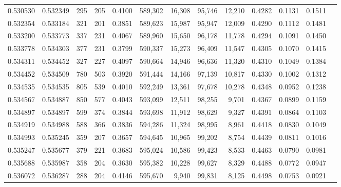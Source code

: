 \begin{tabular}{rrrrrrrrrrrrr}
0.530530 & 0.532349 &   295 &   205 &                                     0.4100 & 589,302 &  16,308 &  95,746 &  12,210 & 0.4282 & 0.1131 & 0.1511 \\
0.532354 & 0.533184 &   321 &   201 &                                     0.3851 & 589,623 &  15,987 &  95,947 &  12,009 & 0.4290 & 0.1112 & 0.1481 \\
0.533200 & 0.533773 &   337 &   231 &                                     0.4067 & 589,960 &  15,650 &  96,178 &  11,778 & 0.4294 & 0.1091 & 0.1450 \\
0.533778 & 0.534303 &   377 &   231 &                                     0.3799 & 590,337 &  15,273 &  96,409 &  11,547 & 0.4305 & 0.1070 & 0.1415 \\
0.534311 & 0.534452 &   327 &   227 &                                     0.4097 & 590,664 &  14,946 &  96,636 &  11,320 & 0.4310 & 0.1049 & 0.1384 \\
0.534452 & 0.534509 &   780 &   503 &                                     0.3920 & 591,444 &  14,166 &  97,139 &  10,817 & 0.4330 & 0.1002 & 0.1312 \\
0.534535 & 0.534535 &   805 &   539 &                                     0.4010 & 592,249 &  13,361 &  97,678 &  10,278 & 0.4348 & 0.0952 & 0.1238 \\
0.534567 & 0.534887 &   850 &   577 &                                     0.4043 & 593,099 &  12,511 &  98,255 &   9,701 & 0.4367 & 0.0899 & 0.1159 \\
0.534897 & 0.534897 &   599 &   374 &                                     0.3844 & 593,698 &  11,912 &  98,629 &   9,327 & 0.4391 & 0.0864 & 0.1103 \\
0.534919 & 0.534988 &   588 &   366 &                                     0.3836 & 594,286 &  11,324 &  98,995 &   8,961 & 0.4418 & 0.0830 & 0.1049 \\
0.534993 & 0.535245 &   359 &   207 &                                     0.3657 & 594,645 &  10,965 &  99,202 &   8,754 & 0.4439 & 0.0811 & 0.1016 \\
0.535247 & 0.535677 &   379 &   221 &                                     0.3683 & 595,024 &  10,586 &  99,423 &   8,533 & 0.4463 & 0.0790 & 0.0981 \\
0.535688 & 0.535987 &   358 &   204 &                                     0.3630 & 595,382 &  10,228 &  99,627 &   8,329 & 0.4488 & 0.0772 & 0.0947 \\
0.536072 & 0.536287 &   288 &   204 &                                     0.4146 & 595,670 &   9,940 &  99,831 &   8,125 & 0.4498 & 0.0753 & 0.0921 \\

\end{tabular}
